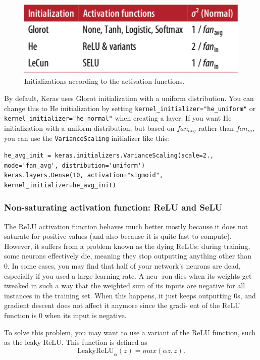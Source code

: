\documentclass[12pt, letterpaper]{article}
\theoremstyle{definition}
\begin{document}
\begin{figure}
\centering
\includegraphics[scale=0.4]{img/initialization}
\caption{Initializations according to the activation functions.}
\label{fig:initial}
\end{figure}
By default, Keras uses Glorot initialization with a uniform distribution. You can change this to He initialization by setting \lstinline+kernel_initializer="he_uniform"+ or \lstinline+kernel_initializer="he_normal"+ when creating a layer.
If you want He initialization with a uniform distribution, but based on $fan_{avg}$ rather
than $fan_{in}$, you can use the \lstinline+VarianceScaling+ initializer like this:
\begin{lstlisting}
he_avg_init = keras.initializers.VarianceScaling(scale=2., mode='fan_avg', distribution='uniform')
keras.layers.Dense(10, activation="sigmoid", kernel_initializer=he_avg_init)
\end{lstlisting}

\subsubsection{Non-saturating activation function: ReLU and SeLU}
The ReLU activation function behaves much better mostly because it does not saturate for positive values (and also because it is quite fast to compute). 
However, it suffers from a problem known as the dying ReLUs: during training, some neurons effectively die, meaning they stop outputting anything other than 0. In some cases, you may find that half of your network’s neurons are dead, especially if you used a large learning rate. A neu‐ ron dies when its weights get tweaked in such a way that the weighted sum of its inputs are negative for all instances in the training set. When this happens, it just keeps outputting 0s, and gradient descent does not affect it anymore since the gradi‐ ent of the ReLU function is 0 when its input is negative.

To solve this problem, you may want to use a variant of the ReLU function, such as the leaky ReLU. This function is defined as
\begin{equation}
\text{LeakyReLU}_\alpha(z) = max(\alpha z, z).
\end{equation}
\end{document}
